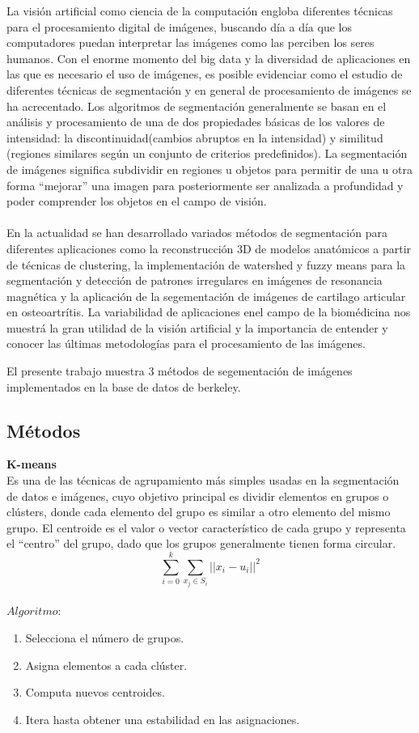 \documentclass[10pt,twocolumn,letterpaper]{article}
\begin{document}
La visión artificial como ciencia de la computación engloba diferentes técnicas para el procesamiento digital de imágenes, buscando día a día que los 
computadores puedan interpretar las imágenes como las perciben los seres humanos. Con el enorme momento del big data y la diversidad de aplicaciones 
en las que es necesario el uso de imágenes, es posible evidenciar como el estudio de diferentes técnicas de segmentación y en general de procesamiento
de imágenes se ha acrecentado. Los algoritmos de segmentación generalmente se basan en el análisis y procesamiento de una de dos propiedades básicas de
los valores de intensidad: la discontinuidad(cambios abruptos en la intensidad) y similitud (regiones similares según un conjunto de criterios predefinidos).
La segmentación de imágenes significa subdividir en regiones u objetos para permitir de una u otra forma “mejorar” una imagen para posteriormente ser analizada a 
profundidad y poder comprender los objetos en el campo de visión. 
\\
\\
En la actualidad se han desarrollado variados métodos de segmentación para diferentes aplicaciones como la reconstrucción 3D de modelos anatómicos a partir de técnicas de clustering\cite{RODRIGUEZ1997},
la implementación de watershed y fuzzy means para la segmentación y detección de patrones irregulares en imágenes de resonancia magnética\cite{1633722} y la aplicación de la segementación de imágenes de cartilago articular en osteoartrítis\cite{5071225}.
La variabilidad de aplicaciones enel campo de la biomédicina nos muestrá la gran utilidad de la visión artificial y la importancia de entender y conocer las últimas metodologías para el procesamiento de las imágenes.
\newline

El presente trabajo muestra 3 métodos de segementación de imágenes implementados en la base de datos de berkeley.


\subsection{Métodos}
\textbf{K-means}
\\
Es una de las técnicas de agrupamiento más simples usadas en la segmentación de datos e imágenes, cuyo objetivo principal es dividir elementos en grupos o clústers, donde cada
elemento del grupo es similar a otro elemento del mismo grupo. El centroide es el valor o vector característico de cada grupo y representa el “centro” del grupo, dado que los
grupos generalmente tienen forma circular.
\begin{equation}\label{eq:1}
\sum_{i=0}^k \sum_{x_j\in S_i}||x_{i}-u_{i}||^2 
\end{equation}
\newline
\\
$Algoritmo:$
\begin{enumerate}
\item Selecciona el número de grupos.
\item Asigna elementos a cada clúster.
\item Computa nuevos centroides.
\item Itera hasta obtener una estabilidad en las asignaciones.
\end{enumerate}
\end{document}
